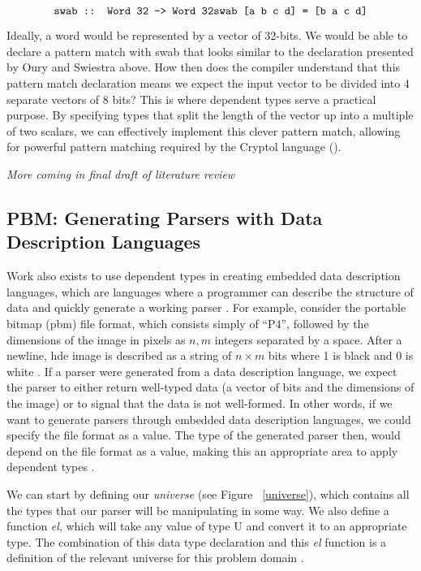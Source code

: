 $$
\texttt{swab :: Word 32 -> Word 32} \\
\texttt{swab [a b c d] = [b a c d]} $$

Ideally, a word would be represented by a vector of 32-bits. We would be able to
declare a pattern match with swab that looks similar to the declaration
presented by Oury and Swiestra above. How then does the compiler understand that
this pattern match declaration means we expect the input vector to be divided
into 4 separate vectors of 8 bits? This is where dependent types serve a
practical purpose. By specifying types that split the length of the vector up
into a multiple of two scalars, we can effectively implement this clever pattern
match, allowing for powerful pattern matching required by the Cryptol language
(\cite{power_of_pi}). 

\textit{More coming in final draft of literature review}

\subsection{PBM: Generating Parsers with Data Description Languages}

Work also exists to use dependent types in creating embedded data description
languages, which are languages where a programmer can describe the structure of
data and quickly generate a working parser \cite{power_of_pi}.  For example,
consider the portable bitmap (pbm) file format, which consists simply of ``P4'',
followed by the dimensions of the image in pixels as $n, m$ integers separated
by a space. After a newline, hde image is described as a string of $n\times m $
bits where 1 is black and 0 is white \cite{pmb_spec}. If a parser were generated
from a data description language, we expect the parser to either return
well-typed data (a vector of bits and the dimensions of the image) or to signal
that the data is not well-formed. In other words, if we want to generate parsers
through embedded data description languages, we could specify the file format as
a value. The type of the generated parser then, would depend on the file format
as a value, making this an appropriate area to apply dependent types
\cite{power_of_pi}. 

We can start by defining our \textit{universe} (see Figure ~\ref{universe}),
which contains all the types that our parser will be manipulating in some way.
We also define a function \textit{el}, which will take any value of type U and
convert it to an appropriate type. The combination of this data type declaration
and this \textit{el} function is a definition of the relevant universe for this
problem domain \cite{power_of_pi}. 

